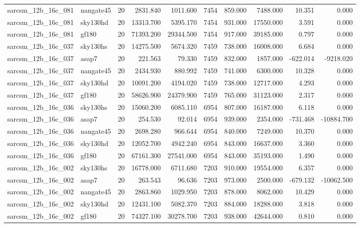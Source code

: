 \begin{longtable}{llrrrrrrrr}
sarcsm\_12b\_16c\_081 & nangate45 & 20 & 2831.840 & 1011.600 & 7454 & 859.000 & 7488.000 & 10.351 & 0.000 \\
sarcsm\_12b\_16c\_081 & sky130hd & 20 & 13313.700 & 5395.170 & 7454 & 931.000 & 17550.000 & 3.591 & 0.000 \\
sarcsm\_12b\_16c\_081 & gf180 & 20 & 71393.200 & 29344.500 & 7454 & 917.000 & 39185.000 & 0.797 & 0.000 \\
sarcsm\_12b\_16c\_037 & sky130hs & 20 & 14275.500 & 5674.320 & 7459 & 738.000 & 16008.000 & 6.684 & 0.000 \\
sarcsm\_12b\_16c\_037 & asap7 & 20 & 221.563 & 79.330 & 7459 & 832.000 & 1857.000 & -622.014 & -9218.020 \\
sarcsm\_12b\_16c\_037 & nangate45 & 20 & 2434.930 & 880.992 & 7459 & 741.000 & 6300.000 & 10.328 & 0.000 \\
sarcsm\_12b\_16c\_037 & sky130hd & 20 & 10091.200 & 4194.020 & 7459 & 738.000 & 12717.000 & 4.293 & 0.000 \\
sarcsm\_12b\_16c\_037 & gf180 & 20 & 58626.900 & 24379.900 & 7459 & 765.000 & 31123.000 & 2.317 & 0.000 \\
sarcsm\_12b\_16c\_036 & sky130hs & 20 & 15060.200 & 6085.110 & 6954 & 807.000 & 16187.000 & 6.118 & 0.000 \\
sarcsm\_12b\_16c\_036 & asap7 & 20 & 254.530 & 92.014 & 6954 & 939.000 & 2354.000 & -731.468 & -10884.700 \\
sarcsm\_12b\_16c\_036 & nangate45 & 20 & 2698.280 & 966.644 & 6954 & 840.000 & 7249.000 & 10.370 & 0.000 \\
sarcsm\_12b\_16c\_036 & sky130hd & 20 & 12052.700 & 4942.240 & 6954 & 843.000 & 16637.000 & 3.360 & 0.000 \\
sarcsm\_12b\_16c\_036 & gf180 & 20 & 67161.300 & 27541.000 & 6954 & 843.000 & 35193.000 & 1.490 & 0.000 \\
sarcsm\_12b\_16c\_002 & sky130hs & 20 & 16778.000 & 6711.680 & 7203 & 910.000 & 19554.000 & 6.357 & 0.000 \\
sarcsm\_12b\_16c\_002 & asap7 & 20 & 263.543 & 96.636 & 7203 & 973.000 & 2500.000 & -679.132 & -10062.500 \\
sarcsm\_12b\_16c\_002 & nangate45 & 20 & 2863.860 & 1029.950 & 7203 & 878.000 & 8062.000 & 10.429 & 0.000 \\
sarcsm\_12b\_16c\_002 & sky130hd & 20 & 12431.100 & 5082.370 & 7203 & 884.000 & 18288.000 & 3.818 & 0.000 \\
sarcsm\_12b\_16c\_002 & gf180 & 20 & 74327.100 & 30278.700 & 7203 & 938.000 & 42644.000 & 0.810 & 0.000 \\

\end{longtable}
